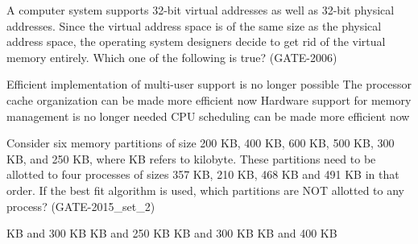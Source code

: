 
\begin{questyle}

  \question  A computer system supports 32-bit virtual addresses as well as 32-bit physical addresses.
             Since the virtual address space is of the same size as the physical address space, the operating system
             designers decide to get rid of the virtual memory entirely. Which one of the following is true? (GATE-2006)

  \begin{choices}
    \choice Efficient implementation of multi-user support is no longer possible
    \choice The processor cache organization can be made more efficient now
    \choice Hardware support for memory management is no longer needed
    \choice CPU scheduling can be made more efficient now
  \end{choices}

\end{questyle}



\begin{questyle}

  \question  Consider six memory partitions of size 200 KB, 400 KB, 600 KB, 500 KB, 300 KB, and 250 KB,
            where KB refers to kilobyte. These partitions need to be allotted to four processes of
            sizes 357 KB, 210 KB, 468 KB and 491 KB in that order. If the best fit algorithm is used,
            which partitions are NOT allotted to any process? (GATE-2015\_set\_2)

  \begin{choices}
     KB and 300 KB
     KB and 250 KB
     KB and 300 KB
     KB and 400 KB
  \end{choices}

\end{questyle}






